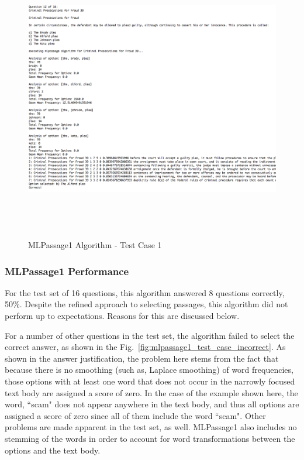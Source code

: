 \begin{figure}
\centering
\vspace{1.0in}
\includegraphics[width=125mm, height=125mm]{mlpassage1_test_case_correct.png}
\caption{MLPassage1 Algorithm - Test Case 1}
\label{fig:mlpassage1_test_case_correct}
\end{figure}

\subsubsection{MLPassage1 Performance}

For the test set of 16 questions, this algorithm answered 8 questions correctly, 50\%.  Despite the refined approach to selecting passages, this algorithm did not perform up to expectations.  Reasons for this are discussed below.


For a number of other questions in the test set, the algorithm failed to select the correct answer, as shown in the Fig.~\ref{fig:mlpassage1_test_case_incorrect}.  As shown in the answer justification, the problem here stems from the fact that because there is no smoothing (such as, Laplace smoothing) of word frequencies, those options with at least one word that does not occur in the narrowly focused text body are assigned a score of zero.  In the case of the example shown here, the word, ``scam" does not appear anywhere in the text body, and thus all options are assigned a score of zero since all of them include the word ``scam".  Other problems are made apparent in the test set, as well.  MLPassage1 also includes no stemming of the words in order to account for word transformations between the options and the text body.  

